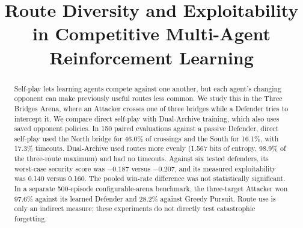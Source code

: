\documentclass[conference]{IEEEtran}
\begin{document}
\title{Route Diversity and Exploitability in Competitive Multi-Agent Reinforcement Learning}

\author{
\and
{}
\and
{}
\and
{}
}

\maketitle

\begin{abstract}
Self-play lets learning agents compete against one another, but each agent's changing opponent can make previously useful routes less common. We study this in the Three Bridges Arena, where an Attacker crosses one of three bridges while a Defender tries to intercept it. We compare direct self-play with Dual-Archive training, which also uses saved opponent policies. In 150 paired evaluations against a passive Defender, direct self-play used the North bridge for 46.0\% of crossings and the South for 16.1\%, with 17.3\% timeouts. Dual-Archive used routes more evenly (1.567 bits of entropy, 98.9\% of the three-route maximum) and had no timeouts. Against six tested defenders, its worst-case security score was $-0.187$ versus $-0.207$, and its measured exploitability was 0.140 versus 0.160. The pooled win-rate difference was not statistically significant. In a separate 500-episode configurable-arena benchmark, the three-target Attacker won 97.6\% against its learned Defender and 28.2\% against Greedy Pursuit. Route use is only an indirect measure; these experiments do not directly test catastrophic forgetting.
\end{abstract}
\end{document}
